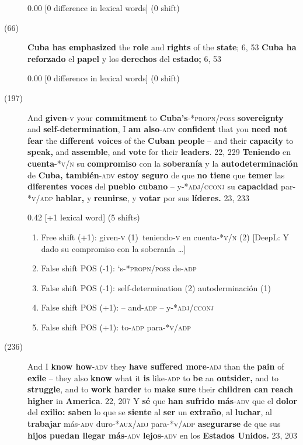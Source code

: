 \documentclass[output=paper]{langsci/langscibook}
\begin{document}
\begin{description}
    0.00 [0 difference in lexical words] (0 shift)

  \item[(66)] \textbf{Cuba has emphasized} the \textbf{role} and \textbf{rights} of the\textbf{ state}; 6, 53 \rightarrow \textbf{Cuba ha reforzado} el \textbf{papel} y los \textbf{derechos} del \textbf{estado;} 6, 53

    0.00 [0 difference in lexical words] (0 shift)

  \item[(197)] And \textbf{given}-\textsc{v} your \textbf{commitment} to \textbf{Cuba’s}\textsc{-*propn/poss} \textbf{sovereignty} and \textbf{self-determination}, I \textbf{am also}\textsc{-adv} \textbf{confident} that you \textbf{need not fear} the \textbf{different voices} of the \textbf{Cuban people} -- and their \textbf{capacity} to \textbf{speak,} and \textbf{assemble}, and \textbf{vote} for their \textbf{leaders}. 22, 229 \rightarrow \textbf{Teniendo} en \textbf{cuenta}\textsc{-*v/n} su \textbf{compromiso} con la \textbf{soberanía} y la \textbf{autodeterminación} de \textbf{Cuba, también}\textsc{-adv} \textbf{estoy seguro} de que \textbf{no tiene} que \textbf{temer} las \textbf{diferentes voces} del \textbf{pueblo cubano} -- y\textsc{-*adj/cconj} su \textbf{capacidad} par\textsc{-*v/adp} \textbf{hablar,} y \textbf{reunirse}, y \textbf{votar} por sus \textbf{líderes.} 23, 233

    0.42 [+1 lexical word] (5 shifts)

    \begin{enumerate}
      \item Free shift (+1): given\textsc{-v} (1)~\rightarrow teniendo-\textsc{v} en cuenta\textsc{-*v/n} (2) [DeepL: Y dado su compromiso con la soberanía \dots]
      \item False shift POS (-1): ‘s-\textsc{*propn/poss} \rightarrow de\textsc{-adp}
      \item False shift POS (-1): self-determination (2) \rightarrow autoderminación (1)
      \item False shift POS (+1): -- and\textsc{-adp} \rightarrow -- y\textsc{-*adj/cconj}
      \item False shift POS (+1): to\textsc{-adp} \rightarrow para\textsc{-*v/adp}
    \end{enumerate}

  \item[(236)] And I \textbf{know how}\textsc{-adv} they \textbf{have suffered more}\textsc{-adj} than the \textbf{pain} of \textbf{exile} -- they also \textbf{know} what it \textbf{is} like\textsc{-adp} to \textbf{be} an \textbf{outsider,} and to \textbf{struggle}, and to \textbf{work harder} to \textbf{make sure} their \textbf{children can reach higher} in \textbf{America}. 22, 207 \rightarrow Y \textbf{sé} que \textbf{han sufrido más}\textsc{-adv} que el \textbf{dolor} del \textbf{exilio: saben} lo que se \textbf{siente} al \textbf{ser} un \textbf{extraño}, al \textbf{luchar}, al \textbf{trabajar} más\textsc{-adv} duro\textsc{-*aux/adj} para\textsc{-*v/adp} \textbf{asegurarse} de que sus \textbf{hijos puedan llegar más}\textsc{-adv} \textbf{lejos}\textsc{-adv} en los \textbf{Estados Unidos.} 23, 203


\end{description}
\end{document}
